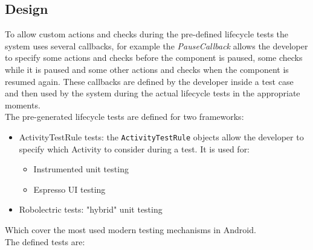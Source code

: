 \documentclass[11pt,a4paper,notitlepage]{article}
\begin{document}
\subsection{Design}
To allow custom actions and checks during the pre-defined lifecycle tests the system uses several callbacks, for example the \textit{PauseCallback} allows the developer to specify some actions and checks before the component is paused, some checks while it is paused and some other actions and checks when the component is resumed again. These callbacks are defined by the developer inside a test case and then used by the system during the actual lifecycle tests in the appropriate moments.\medskip \\
The pre-generated lifecycle tests are defined for two frameworks:
\begin{itemize}
	\item ActivityTestRule tests: the \texttt{ActivityTestRule} objects allow the developer to specify which Activity to consider during a test. It is used for:
	\begin{itemize}
		\item Instrumented unit testing
		\item Espresso UI testing
	\end{itemize}
	\item Robolectric tests: "hybrid" unit testing
\end{itemize}
Which cover the most used modern testing mechanisms in Android.\bigskip \\
The defined tests are:
\end{document}
